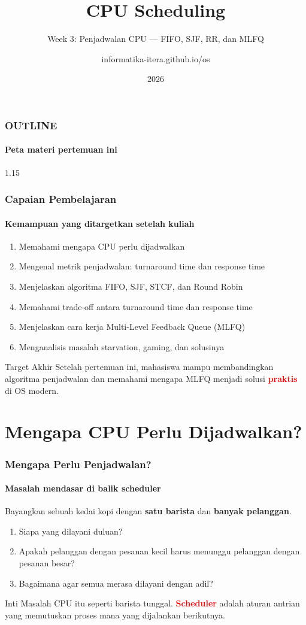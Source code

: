 \documentclass[t,aspectratio=169,xcolor=dvipsnames]{beamer}
\title[CPU Scheduling]{CPU Scheduling}
\subtitle{Week 3: Penjadwalan CPU --- FIFO, SJF, RR, dan MLFQ}
\author[informatika-itera.github.io/os]{informatika-itera.github.io/os}
\institute[ITERA]{Program Studi Teknik Informatika \\ Institut Teknologi Sumatera}
\date{\textcolor{nyublue}{2026}}
\newcommand{\tem}[1]{\textbf{\textcolor{red}{#1}}}
\begin{document}
\begin{frame}
    \titlepage
\end{frame}

\begin{frame}
    \frametitle{OUTLINE}
    \framesubtitle{Peta materi pertemuan ini}
    \small
    \begin{spacing}{1.15}
        \tableofcontents
    \end{spacing}
\end{frame}

\begin{frame}
    \frametitle{Capaian Pembelajaran}
    \framesubtitle{Kemampuan yang ditargetkan setelah kuliah}
    \small
    \begin{enumerate}
        \item Memahami mengapa CPU perlu dijadwalkan
        \item Mengenal metrik penjadwalan: turnaround time dan response time
        \item Menjelaskan algoritma FIFO, SJF, STCF, dan Round Robin
        \item Memahami trade-off antara turnaround time dan response time
        \item Menjelaskan cara kerja Multi-Level Feedback Queue (MLFQ)
        \item Menganalisis masalah starvation, gaming, dan solusinya
    \end{enumerate}
    \begin{exampleblock}{Target Akhir}
        Setelah pertemuan ini, mahasiswa mampu membandingkan algoritma penjadwalan dan memahami mengapa MLFQ menjadi solusi \tem{praktis} di OS modern.
    \end{exampleblock}
\end{frame}


\section{Mengapa CPU Perlu Dijadwalkan?}

\begin{frame}
    \frametitle{Mengapa Perlu Penjadwalan?}
    \framesubtitle{Masalah mendasar di balik scheduler}
    \small
    Bayangkan sebuah kedai kopi dengan \textbf{satu barista} dan \textbf{banyak pelanggan}.
    \begin{enumerate}
        \item Siapa yang dilayani duluan?
        \item Apakah pelanggan dengan pesanan kecil harus menunggu pelanggan dengan pesanan besar?
        \item Bagaimana agar semua merasa dilayani dengan adil?
    \end{enumerate}
    \begin{alertblock}{Inti Masalah}
        CPU itu seperti barista tunggal. \tem{Scheduler} adalah aturan antrian yang memutuskan proses mana yang dijalankan berikutnya.
    \end{alertblock}
\end{frame}
\end{document}
